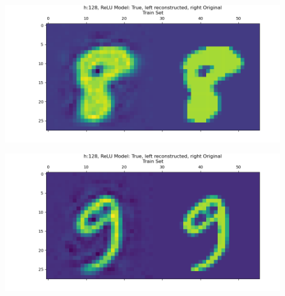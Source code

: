 \documentclass[]{article}
\begin{document}
            \begin{center}
                \includegraphics*[width=12cm]{A4plots/06-57-23-h-128-nonlin-digit-8.png}
            \end{center}
            \begin{center}
                \includegraphics*[width=12cm]{A4plots/06-57-24-h-128-nonlin-digit-9.png}
            \end{center}
\end{document}
